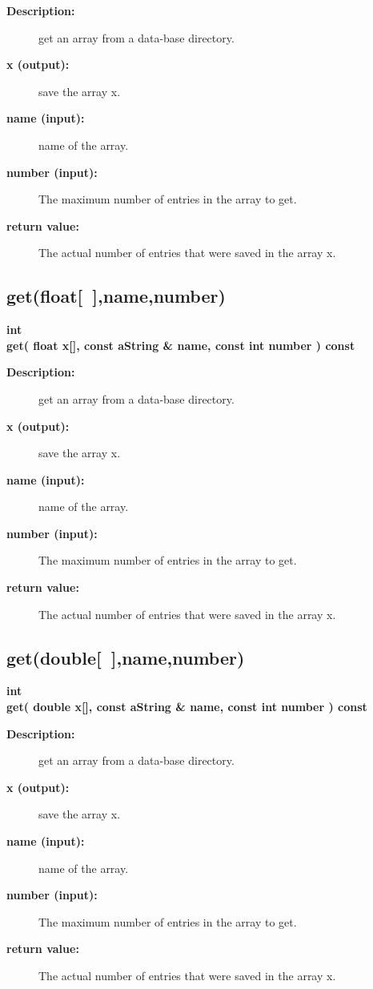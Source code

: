 \begin{description}
\item[{\bf Description:}]  get an array from a data-base directory.
\item[{\bf x (output):}]  save the array x.
\item[{\bf name (input):}]  name of the array.
\item[{\bf number (input):}]  The maximum number of entries in the array to get.
\item[{\bf return value:}]  The actual number of entries that were saved in the array x.

\end{description}
\subsection{get(float[~],name,number) }
 
\begin{flushleft} \textbf{%
int  \\ 
\settowidth{\GenericDataBaseIncludeArgIndent}{get(}%
get( float x[], const aString \& name, const int number ) const
}\end{flushleft}
    
\begin{description}
\item[{\bf Description:}]  get an array from a data-base directory.
\item[{\bf x (output):}]  save the array x.
\item[{\bf name (input):}]  name of the array.
\item[{\bf number (input):}]  The maximum number of entries in the array to get.
\item[{\bf return value:}]  The actual number of entries that were saved in the array x.

\end{description}
\subsection{get(double[~],name,number) }
 
\begin{flushleft} \textbf{%
int  \\ 
\settowidth{\GenericDataBaseIncludeArgIndent}{get(}%
get( double x[], const aString \& name, const int number ) const
}\end{flushleft}
    
\begin{description}
\item[{\bf Description:}]  get an array from a data-base directory.
\item[{\bf x (output):}]  save the array x.
\item[{\bf name (input):}]  name of the array.
\item[{\bf number (input):}]  The maximum number of entries in the array to get.
\item[{\bf return value:}]  The actual number of entries that were saved in the array x.

\end{description}
